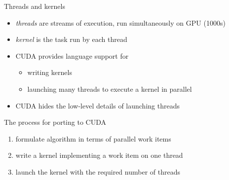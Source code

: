 
\begin{frame}[fragile]{}
    \begin{info}{Threads and kernels}
        \begin{itemize}
            \item \emph{threads} are streams of execution, run simultaneously on GPU (1000s)
            \item \emph{kernel} is the task run by each thread
            \item CUDA provides language support for
            \begin{itemize}
                \item writing kernels
                \item launching many threads to execute a kernel in parallel
            \end{itemize}
            \item CUDA hides the low-level details of launching threads
        \end{itemize}
    \end{info}
    \begin{info}{The process for porting to CUDA}
        \begin{enumerate}
            \item formulate algorithm in terms of parallel work items
            \item write a kernel implementing a work item on one thread
            \item launch the kernel with the required number of threads
        \end{enumerate}
    \end{info}

\end{frame}

